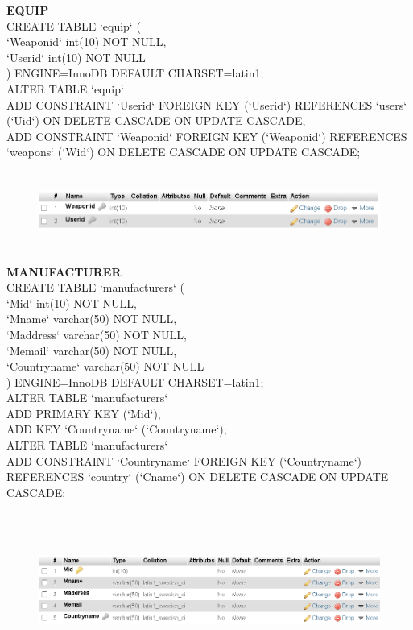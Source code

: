 \documentclass[12pt,a4paper]{report}
\begin{document}
\begin{flushleft}
\textbf{EQUIP}\\
CREATE TABLE `equip` (\\
  `Weaponid` int(10) NOT NULL,\\
  `Userid` int(10) NOT NULL\\
) ENGINE=InnoDB DEFAULT CHARSET=latin1;\\
ALTER TABLE `equip`\\
  ADD CONSTRAINT `Userid` FOREIGN KEY (`Userid`) REFERENCES `users` (`Uid`) ON DELETE CASCADE ON UPDATE CASCADE,\\
  ADD CONSTRAINT `Weaponid` FOREIGN KEY (`Weaponid`) REFERENCES `weapons` (`Wid`) ON DELETE CASCADE ON UPDATE CASCADE;
\end{flushleft}
\begin{figure}[hbtp]
\centering
\includegraphics[width=6.0in,height=1.0in]{../fig/Equip}\\
\end{figure}
\begin{flushleft}
\newpage
\textbf{MANUFACTURER}\\
CREATE TABLE `manufacturers` (\\
  `Mid` int(10) NOT NULL,\\
  `Mname` varchar(50) NOT NULL,\\
  `Maddress` varchar(50) NOT NULL,\\
  `Memail` varchar(50) NOT NULL,\\
  `Countryname` varchar(50) NOT NULL\\
) ENGINE=InnoDB DEFAULT CHARSET=latin1;\\
ALTER TABLE `manufacturers`\\
  ADD PRIMARY KEY (`Mid`),\\
  ADD KEY `Countryname` (`Countryname`);\\
ALTER TABLE `manufacturers`\\
  ADD CONSTRAINT `Countryname` FOREIGN KEY (`Countryname`) REFERENCES `country` (`Cname`) ON DELETE CASCADE ON UPDATE CASCADE;
\end{flushleft}
\begin{figure}[hbtp]
\centering
\includegraphics[width=6.0in,height=2in]{../fig/Manufacturer}\\
\end{figure}
\end{document}
